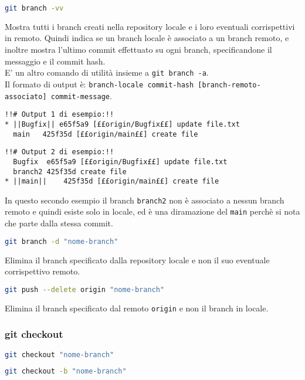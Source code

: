 \begin{lstlisting}[language=bash]
	git branch -vv
\end{lstlisting}
Mostra tutti i branch creati nella repository locale e i loro eventuali corrispettivi in remoto. Quindi indica se un branch locale è associato a un branch remoto, e inoltre mostra l'ultimo commit effettuato su ogni branch, specificandone il messaggio e il commit hash.\\
E' un altro comando di utilità insieme a \texttt{git branch -a}.\\
Il formato di output è: \texttt{branch-locale commit-hash [branch-remoto-associato] commit-message}.
\begin{lstlisting}[backgroundcolor=\color{green!5}]
  !!# Output 1 di esempio:!!
* ||Bugfix|| e65f5a9 [££origin/Bugfix££] update file.txt
  main   425f35d [££origin/main££] create file
\end{lstlisting}
\begin{lstlisting}[backgroundcolor=\color{green!5}]
  !!# Output 2 di esempio:!!
  Bugfix  e65f5a9 [££origin/Bugfix££] update file.txt
  branch2 425f35d create file
* ||main||    425f35d [££origin/main££] create file
\end{lstlisting}
In questo secondo esempio il branch \texttt{branch2} non è associato a nessun branch remoto e quindi esiste solo in locale, ed è una diramazione del \texttt{main} perchè si nota che parte dalla stessa commit.\\

\begin{lstlisting}[language=bash]
	git branch -d "nome-branch"
\end{lstlisting}
Elimina il branch specificato dalla repository locale e non il suo eventuale corrispettivo remoto.\\

\begin{lstlisting}[language=bash]
	git push --delete origin "nome-branch"
\end{lstlisting}
Elimina il branch specificato dal remoto \texttt{origin} e non il branch in locale.\\

\subsubsection{git checkout}
\begin{lstlisting}[language=bash]
	git checkout "nome-branch" 
\end{lstlisting}
\begin{lstlisting}[language=bash]
	git checkout -b "nome-branch" 
\end{lstlisting}

